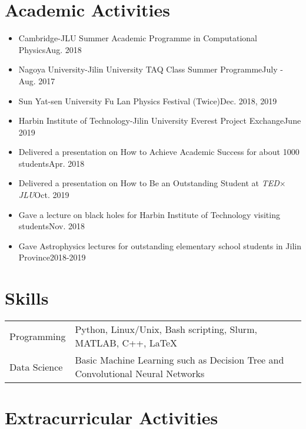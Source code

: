 \documentclass[a4paper,12pt]{article}
\begin{document}


\section{Academic Activities}

\begin{itemize}[leftmargin=0cm]
\setlength{\itemsep}{-5pt}
\item[] Cambridge-JLU Summer Academic Programme in Computational Physics\hfill Aug. 2018
\item[] Nagoya University-Jilin University TAQ Class Summer Programme\hfill July - Aug. 2017
\item[] Sun Yat-sen University Fu Lan Physics Festival (Twice)\hfill Dec. 2018, 2019
\item[] Harbin Institute of Technology-Jilin University Everest Project Exchange\hfill June 2019
\item[] Delivered a presentation on How to Achieve Academic Success for about {1000} students\hfill Apr. 2018
\item[] Delivered a presentation on How to Be an Outstanding Student at {\textit{TED$\times$JLU}}\hfill Oct. 2019
\item[] Gave a lecture on black holes for Harbin Institute of Technology visiting students\hfill Nov. 2018
\item[] Gave Astrophysics lectures for outstanding elementary school students in Jilin Province\hfill 2018-2019
\end{itemize}
\section{Skills}
\begin{tabularx}{\linewidth}{@{}l X@{}}
Programming &  \normalsize{Python, Linux/Unix, Bash scripting, Slurm, MATLAB, C++, \LaTeX}\\
Data Science &  \normalsize{Basic Machine Learning such as Decision Tree and Convolutional Neural Networks}\\  
\end{tabularx}


\section{Extracurricular Activities}
\end{document}

